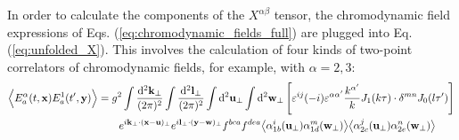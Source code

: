 In order to  calculate the components of the $X^{\alpha \beta}$ tensor, the chromodynamic field expressions of Eqs. (\ref{eq:chromodynamic_fields_full}) are plugged into Eq. (\ref{eq:unfolded_X}). This involves the calculation of four kinds of two-point correlators of chromodynamic fields, for example, with $\alpha = 2,3$:
\begin{equation}
\begin{alignedat}{1}
\Big< E^\alpha_a  (t,\mathbf{x}) E^1_a (t',\mathbf{y}) \Big>
 & = g^2 \int  \frac{\mathop{}\!\mathrm{d}^2 \mathbf{k_\perp}}{(2\pi)^2}
\int \frac{\mathop{}\!\mathrm{d}^2 \mathbf{l}_\perp}{(2\pi)^2}
\int \mathop{}\!\mathrm{d}^2 \mathbf{u}_\perp
 \int \mathop{}\!\mathrm{d}^2 \mathbf{w}_\perp 
\left[ \varepsilon^{ij} 
(-i) \varepsilon^{\alpha \alpha'} \frac{k^{\alpha'}}{k} J_1(k \tau) \cdot \delta^{mn} J_0 (l \tau')  \right] \\
& \qquad e^{i \mathbf{k}_\perp \cdot (\mathbf{x} - \mathbf{u})_\perp}
 e^{i \mathbf{l}_\perp \cdot (\mathbf{y} - \mathbf{w})_\perp}
 f^{bca} f^{dea}
 \big< \alpha^i_{1b} (\mathbf{u}_\perp) \alpha^m_{1d} (\mathbf{w}_\perp) \big>
 \big< \alpha^j_{2c} (\mathbf{u}_\perp) \alpha^n_{2e} (\mathbf{w}_\perp) \big>
\end{alignedat}
\label{eq:generalized_chromodynamic_correlator}
\end{equation}
